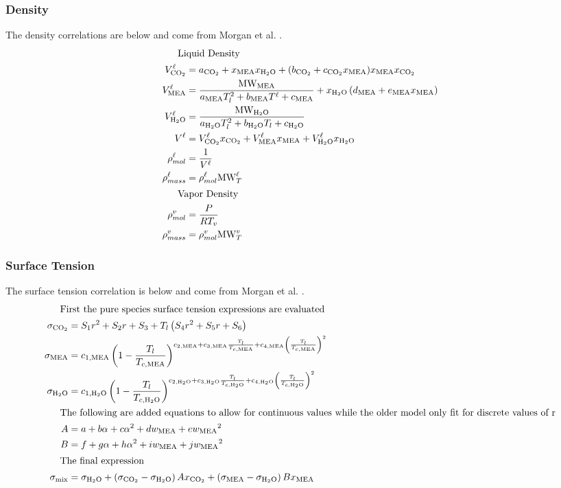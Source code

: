 \documentclass[a4paper,fleqn]{cas-sc}
\newcommand{\COtwo}{{\ce{CO2}}}
\newcommand{\HtwoO}{{\ce{H2O}}}
\newcommand{\MEA}{{\ce{MEA}}}
\newcommand{\liq}{\ell}
\newcommand{\vap}{v}
\begin{document}
    \subsubsection{Density}
    The density correlations are below and come from Morgan et al. \cite{Morgan2015}.
    \begin{align}
        \shortintertext{\quad\; Liquid Density}
        V^{\liq}_{\COtwo} &=  a_{\COtwo} + x_{\MEA} x_{\HtwoO} + (b_{\COtwo} + c_{\COtwo} x_{\MEA}) x_{\MEA} x_{\COtwo} \\
        V^{\liq}_{\MEA} &=  \frac{\text{MW}_{\MEA}}{a_{\MEA} T_l^2 + b_{\MEA} T^{\liq} + c_{\MEA}} + x_{\HtwoO}\left(d_{\MEA} + e_{\MEA}x_{\MEA} \right) \\
        V^{\liq}_{\HtwoO} &=  \frac{\text{MW}_{\HtwoO}}{a_{\HtwoO} T_l^2 + b_{\HtwoO} T_l + c_{\HtwoO}} \\
        V^{\liq} &= V^{\liq}_{\COtwo}x_{\COtwo} + V^{\liq}_{\MEA}x_{\MEA} + V^{\liq}_{\HtwoO}x_{\HtwoO} \\
        \rho ^{\liq}_{mol} &= \frac{1}{V^{\liq}} \\
        \rho ^{\liq}_{mass} &= \rho ^{\liq}_{mol}\text{MW}^{\liq}_{T} \\
        \shortintertext{\quad\; Vapor Density}
        \rho ^{\vap}_{mol} &= \frac{P}{RT_v} \\
        \rho ^{\vap}_{mass} &= \rho ^{\vap}_{mol}\text{MW}^{\vap}_{T}
    \end{align}

    \subsubsection{Surface Tension}
    The surface tension correlation is below and come from Morgan et al. \cite{Morgan2015}.
    \begin{align}
        \shortintertext{\quad\; First the pure species surface tension expressions are evaluated}
        \sigma _{\COtwo} &= S_1 r^2+S_2 r+S_3+T_l \left(S_4 r^2+S_5 r+S_6\right) \\
        \sigma _{\MEA} &= c_{1,\MEA} \left(1-\frac{T_l}{T_{c,\MEA}}\right)^{c_{2,\MEA}+c_{3,\MEA} \frac{T_l}{T_{c,\MEA}}+c_{4,\MEA} \left(\frac{T_l}{T_{c,\MEA}}\right)^2} \\
        \sigma _{\HtwoO} &= c_{1,\HtwoO} \left(1-\frac{T_l}{T_{c,\HtwoO}}\right)^{c_{2,\HtwoO}+c_{3,\HtwoO} \frac{T_l}{T_{c,\HtwoO}}+c_{4,\HtwoO} \left(\frac{T_l}{T_{c,\HtwoO}}\right)^2} \\
        \shortintertext{\quad\; The following are added equations to allow for continuous values while the older model only fit for discrete values of r}
        A &= a+b \alpha+c {\alpha}^2+d w_{\MEA}+e {w_{\MEA}}^2 \\
        B &= f+g \alpha+h {\alpha}^2+i w_{\MEA}+j {w_{\MEA}}^2 \\
        \shortintertext{\quad\; The final expression}
        \sigma _{\text{mix}} &= \sigma_{\HtwoO}+\left(\sigma_{\COtwo}-\sigma_{\HtwoO}\right) A x_{\COtwo}+\left(\sigma_{\MEA}-\sigma_{\HtwoO}\right) B x_{\MEA}
    \end{align}
\end{document}
